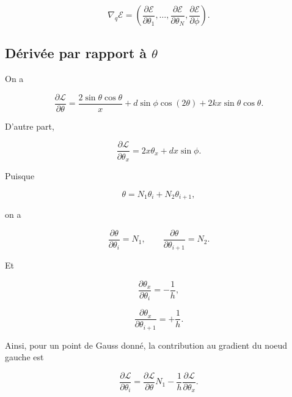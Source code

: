 \documentclass[a4paper,11pt]{article}
\begin{document}
\begin{equation}
\nabla_q\mathcal E
=
\left(
\frac{\partial\mathcal E}{\partial\theta_1},
\ldots,
\frac{\partial\mathcal E}{\partial\theta_N},
\frac{\partial\mathcal E}{\partial\phi}
\right).
\end{equation}

\subsection{Dérivée par rapport à $\theta$}

On a

\begin{equation}
\frac{\partial\mathcal L}{\partial\theta}
=
\frac{2\sin\theta\cos\theta}{x}
+
d\sin\phi\cos(2\theta)
+
2kx\sin\theta\cos\theta.
\end{equation}

D'autre part,

\begin{equation}
\boxed{
\frac{\partial\mathcal L}
{\partial\theta_x}
=
2x\theta_x
+
dx\sin\phi.
}
\end{equation}

Puisque

\begin{equation}
\theta
=
N_1\theta_i+N_2\theta_{i+1},
\end{equation}

on a

\begin{equation}
\frac{\partial\theta}{\partial\theta_i}
=
N_1,
\qquad
\frac{\partial\theta}{\partial\theta_{i+1}}
=
N_2.
\end{equation}

Et

\begin{equation}
\frac{\partial\theta_x}{\partial\theta_i}
=
-\frac{1}{h},
\end{equation}

\begin{equation}
\frac{\partial\theta_x}{\partial\theta_{i+1}}
=
+\frac{1}{h}.
\end{equation}

Ainsi, pour un point de Gauss donné, la contribution au gradient du noeud
gauche est

\begin{equation}
\boxed{
\frac{\partial\mathcal L}{\partial\theta_i}
=
\frac{\partial\mathcal L}{\partial\theta}N_1
-
\frac{1}{h}
\frac{\partial\mathcal L}{\partial\theta_x}.
}
\end{equation}
\end{document}
